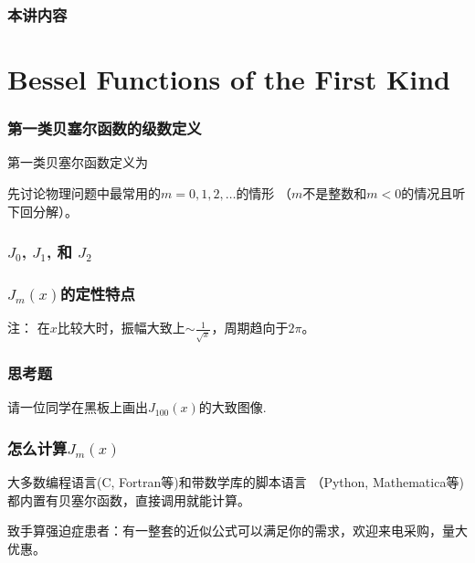 \documentclass[CJK]{beamer}
\date{}
\begin{document}
  \bch
{}

\begin{frame}
\frametitle{本讲内容}
\tableofcontents
\end{frame}

\section{Bessel Functions of the First Kind}

\begin{frame}
  \frametitle{第一类贝塞尔函数的级数定义}
  
  第一类贝塞尔函数定义为

  先讨论物理问题中最常用的$m=0,1,2,\ldots$的情形 （$m$不是整数和$m<0$的情况且听下回分解）。

  
\end{frame}


\begin{frame}
  \frametitle{$J_0$, $J_1$, 和 $J_2$}
  
  
\end{frame}

\begin{frame}
  \frametitle{$J_m(x)$的定性特点}
  
 注： 在$x$比较大时，振幅大致上$\sim \frac{1}{\sqrt{x}}$，周期趋向于$2\pi$。
  
\end{frame}


\begin{frame}
  \frametitle{思考题}
  
  请一位同学在黑板上画出$J_{100}(x)$的大致图像.
  
\end{frame}



\begin{frame}
  \frametitle{怎么计算$J_m(x)$}
  
  大多数编程语言(C, Fortran等)和带数学库的脚本语言 （Python, Mathematica等)都内置有贝塞尔函数，直接调用就能计算。

    \skiplines
    
  致手算强迫症患者\huaixiao：有一整套的近似公式可以满足你的需求，欢迎来电采购，量大优惠。
  
\end{frame}
\end{document}
